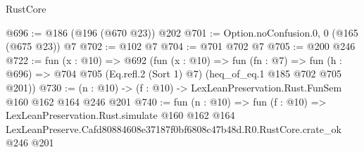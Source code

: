 \begin{lexlean}{RustCore}
\begin{coremodule}
@696 := @186 (@196 (@670 @23)) @202
@701 := Option.noConfusion.{0, 0} (@165 (@675 @23)) @7
@702 := @102 @7
@704 := @701 @702 @7
@705 := @200 @246
@722 := fun (x : @10) =>
  @692
    (fun (x : @10) =>
    fun (fn : @7) =>
    fun (h : @696) => @704 @705 (Eq.refl.{2} (Sort 1) @7) (heq_of_eq.{1} @185 @702 @705 @201))
@730 := (n : @10) -> (f : @10) -> LexLeanPreservation.Rust.FunSem @160 @162 @164 @246 @201
@740 := fun (n : @10) =>
  fun (f : @10) =>
  LexLeanPreservation.Rust.simulate
    @160
    @162
    @164
    LexLeanPreserve.Cafd80884608e37187f0bf6808c47b48d.R0.RustCore.crate_ok
    @246
    @201
\end{coremodule}
\end{lexlean}
